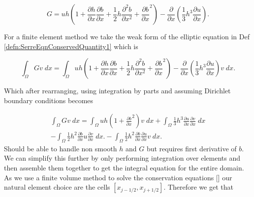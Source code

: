 	\[ G =  uh \left(1 + \frac{\partial h}{\partial x}\frac{\partial b}{\partial x} + \frac{1}{2}h\frac{\partial^2 b}{\partial x^2} + \frac{\partial b}{\partial x}^2 \right) - \frac{\partial}{\partial x}\left(\frac{1}{3}h^3  \frac{\partial {u}}{\partial x}\right).\]

For a finite element method we take the weak form of the elliptic equation in Def \ref{defn:SerreEqnConservedQuantity1} which is 

	\[ \int_{\Omega } G v \; dx =  \int_{\Omega } uh \left(1 + \frac{\partial h}{\partial x}\frac{\partial b}{\partial x} + \frac{1}{2}h\frac{\partial^2 b}{\partial x^2} + \frac{\partial b}{\partial x}^2 \right) - \frac{\partial}{\partial x}\left(\frac{1}{3}h^3  \frac{\partial {u}}{\partial x}\right) v \; dx.\]
	
Which after rearranging, using integration by parts and assuming Dirichlet boundary conditions becomes



\begin{multline*}
\int_{\Omega } G v \; dx = \int_{\Omega } uh \left(1 + \frac{\partial b}{\partial x}^2 \right) v \; dx +  \int_{\Omega } \frac{1}{3}h^3  \frac{\partial {u}}{\partial x} \frac{\partial v}{\partial x} \; dx  \\ - 
\int_{\Omega }   \frac{1}{2}h^2\frac{\partial b}{\partial x} u \frac{\partial v }{\partial x}\; dx. - 
\int_{\Omega }   \frac{1}{2}h^2\frac{\partial b}{\partial x}  \frac{\partial u }{\partial x}v \; dx.
\end{multline*}
Should be able to handle non smooth $h$ and $G$ but requires first derivative of $b$. We can simplify this further by only performing integration over elements and then assemble them together to get the integral equation for the entire domain. As we use a finite volume method to solve the conservation equations [] our natural element choice are the cells $\left[x_{j-1/2},x_{j+1/2}\right]$. Therefore we get that

